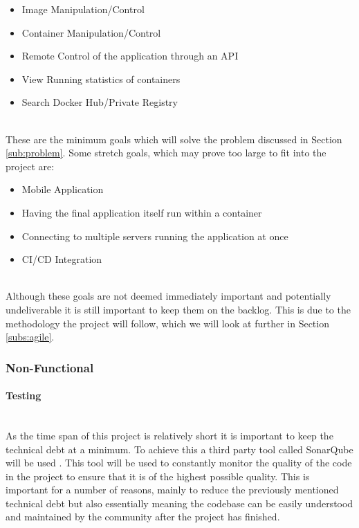 \begin{itemize}
  \item Image Manipulation/Control
  \item Container Manipulation/Control
  \item Remote Control of the application through an \gls{API}
  \item View Running statistics of containers
  \item Search Docker Hub/Private Registry 
\end{itemize}
\mbox{}\\
These are the minimum goals which will solve the problem discussed in Section \ref{sub:problem}. Some stretch goals, which may prove too large to fit into the project are:
\mbox{}\\
\begin{itemize}
  \item Mobile Application
  \item Having the final application itself run within a container
  \item Connecting to multiple servers running the application at once
  \item CI/CD Integration
\end{itemize}
\mbox{}\\
Although these goals are not deemed immediately important and potentially undeliverable it is still important to keep them on the backlog. This is due to the methodology the project will follow, which we will look at further in Section \ref{subs:agile}.

\subsubsection{Non-Functional}

\paragraph{Testing}\mbox{}\\
As the time span of this project is relatively short it is important to keep the \gls{technical debt} at a minimum. To achieve this a third party tool called SonarQube will be used \citep{Sonar2016}. This tool will be used to constantly monitor the quality of the code in the project to ensure that it is of the highest possible quality. This is important for a number of reasons, mainly to reduce the previously mentioned technical debt but also essentially meaning the codebase can be easily understood and maintained by the community after the project has finished. 

